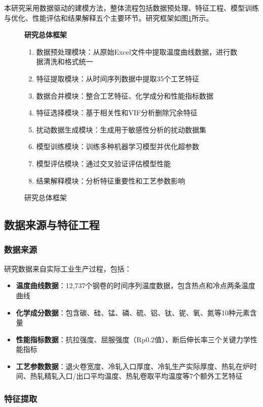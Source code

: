 \documentclass[12pt,a4paper]{article}
\begin{document}
本研究采用数据驱动的建模方法，整体流程包括数据预处理、特征工程、模型训练与优化、性能评估和结果解释五个主要环节。研究框架如图\ref{fig:framework}所示。

\begin{figure}[H]
\centering
\textbf{研究总体框架}
\begin{enumerate}
\item 数据预处理模块：从原始Excel文件中提取温度曲线数据，进行数据清洗和格式统一
\item 特征提取模块：从时间序列数据中提取35个工艺特征
\item 数据合并模块：整合工艺特征、化学成分和性能指标数据
\item 特征选择模块：基于相关性和VIF分析删除冗余特征
\item 扰动数据生成模块：生成用于敏感性分析的扰动数据集
\item 模型训练模块：训练多种机器学习模型并优化超参数
\item 模型评估模块：通过交叉验证评估模型性能
\item 结果解释模块：分析特征重要性和工艺参数影响
\end{enumerate}
\caption{研究总体框架}
\label{fig:framework}
\end{figure}

\subsection{数据来源与特征工程}

\subsubsection{数据来源}

研究数据来自实际工业生产过程，包括：
\begin{itemize}
\item \textbf{温度曲线数据}：12,737个钢卷的时间序列温度数据，包含热点和冷点两条温度曲线
\item \textbf{化学成分数据}：包含碳、硅、锰、磷、硫、铝、钛、铌、氧、氮等10种元素含量
\item \textbf{性能指标数据}：抗拉强度、屈服强度（Rp0.2值）、断后伸长率三个关键力学性能指标
\item \textbf{工艺参数数据}：退火卷宽度、冷轧入口厚度、冷轧生产实际厚度、热轧在炉时间、热轧精轧入口/出口平均温度、热轧卷取平均温度等7个额外工艺特征
\end{itemize}

\subsubsection{特征提取}
\end{document}
